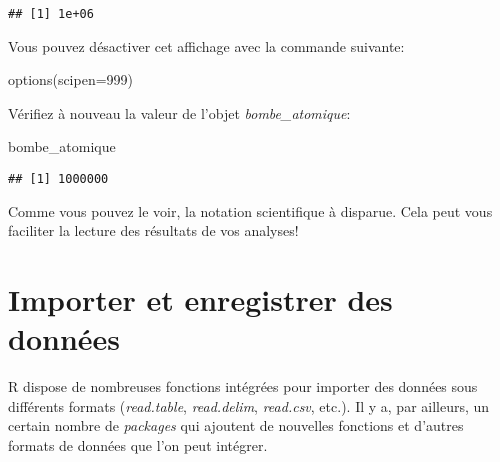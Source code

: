 \documentclass[
]{book}
\newenvironment{Shaded}{\begin{snugshade}}{\end{snugshade}}
\newcommand{\AttributeTok}[1]{\textcolor[rgb]{0.77,0.63,0.00}{#1}}
\newcommand{\DecValTok}[1]{\textcolor[rgb]{0.00,0.00,0.81}{#1}}
\newcommand{\FunctionTok}[1]{\textcolor[rgb]{0.00,0.00,0.00}{#1}}
\newcommand{\NormalTok}[1]{#1}
\begin{document}
\begin{verbatim}
## [1] 1e+06
\end{verbatim}

Vous pouvez désactiver cet affichage avec la commande suivante:

\begin{Shaded}
\begin{Highlighting}[]
\FunctionTok{options}\NormalTok{(}\AttributeTok{scipen=}\DecValTok{999}\NormalTok{)}
\end{Highlighting}
\end{Shaded}

Vérifiez à nouveau la valeur de l'objet \emph{bombe\_atomique}:

\begin{Shaded}
\begin{Highlighting}[]
\NormalTok{bombe\_atomique}
\end{Highlighting}
\end{Shaded}

\begin{verbatim}
## [1] 1000000
\end{verbatim}

Comme vous pouvez le voir, la notation scientifique à disparue. Cela peut vous faciliter la lecture des résultats de vos analyses!

\hypertarget{import_donnees}{%
\section{Importer et enregistrer des données}\label{import_donnees}}

R dispose de nombreuses fonctions intégrées pour importer des données sous différents formats (\emph{read.table}, \emph{read.delim}, \emph{read.csv}, etc.). Il y a, par ailleurs, un certain nombre de \emph{packages} qui ajoutent de nouvelles fonctions et d'autres formats de données que l'on peut intégrer.
\end{document}
